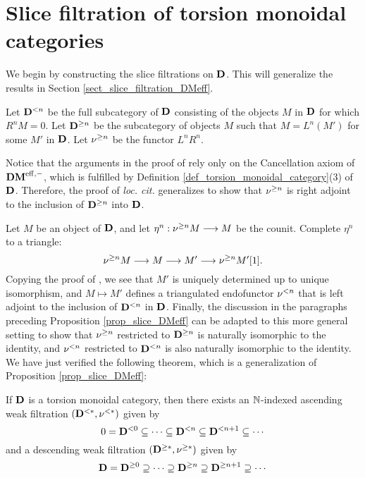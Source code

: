 \section{Slice filtration of torsion monoidal categories}
\label{sect_summary_slice_filt_on_DCat}

We begin by constructing the slice filtrations on $\mathbf{D}$. This
will generalize the results in Section 
\ref{sect_slice_filtration_DMeff}.

\begin{defn}\label{def_slice_filt_general}
Let $\mathbf{D}^{< n}$ be the full subcategory of $\mathbf{D}$ consisting of the objects
$M$ in $\mathbf{D}$ for which $R^n M = 0$. Let $\mathbf{D}^{\geq n}$ be 
the subcategory of objects $M$ such that $M = L^n(M')$ for some 
$M'$ in $\mathbf{D}$. Let $\nu^{\geq n}$ be the functor  $L^nR^n$.
\end{defn}

Notice that the arguments in the proof of \cite[1.1]{HuKa} rely 
only on the Cancellation axiom of $\mathbf{DM}^{\mathrm{eff},-}$, which is fulfilled by 
Definition \ref{def_torsion_monoidal_category}(3) of $\mathbf{D}$. 
Therefore, the proof of \emph{loc. cit.} generalizes to show that 
$\nu^{\geq n}$ is right adjoint to the inclusion of 
$\mathbf{D}^{\geq n}$ into $\mathbf{D}$. 

Let $M$ be an object of $\mathbf{D}$, and let $\eta^n : \nu^{\geq n} M 
\longrightarrow M$ be the counit. Complete $\eta^n$ to a triangle:
\[
\nu^{\geq n} M \longrightarrow M \longrightarrow M' \longrightarrow \nu^{\geq n} M'[1].
\]
Copying the proof of \cite[1.3]{HuKa}, we see that $M'$ is 
uniquely determined up to unique isomorphism, and $M \mapsto
M'$ defines a triangulated endofunctor $\nu^{< n}$ that is
left adjoint to the inclusion of $\mathbf{D}^{< n}$ in $\mathbf{D}$.
Finally, the discussion in the paragraphs preceding Proposition 
\ref{prop_slice_DMeff} can be adapted to this more general setting
to show that $\nu^{\geq n}$ restricted to $\mathbf{D}^{\geq n}$ is 
naturally isomorphic to the identity, and $\nu^{< n}$ restricted 
to $\mathbf{D}^{< n}$ is also naturally isomorphic to the 
identity. We have just verified the following theorem, which is a 
generalization of Proposition \ref{prop_slice_DMeff}:

\begin{thm}\label{thm_summary_triang_cat}
If $\mathbf{D}$ is a torsion monoidal category, then there exists an
$\mathbb{N}$-indexed ascending weak filtration $(\mathbf{D}^{< *},
\nu^{< *})$ given by
\[
0 = \mathbf{D}^{< 0} \subseteq \cdots \subseteq \mathbf{D}^{< n}
   \subseteq \mathbf{D}^{< n + 1} \subseteq \cdots
\]
and a descending weak filtration $(\mathbf{D}^{\geq *}, \nu^{\geq *})$
given by
\[
\mathbf{D} = \mathbf{D}^{\geq 0} \supseteq \cdots \supseteq \mathbf{D}^{\geq n}
\supseteq \mathbf{D}^{\geq n + 1} \supseteq \cdots
\]
\end{thm}

